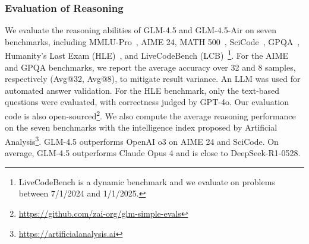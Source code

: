 \documentclass{article}
\theoremstyle{definition}
\begin{document}
\noindent\begin{minipage}{\textwidth}
\label{fig:tau-prompt}
\end{minipage}

\subsubsection{Evaluation of Reasoning}

We evaluate the reasoning abilities of GLM-4.5 and GLM-4.5-Air on seven benchmarks, including MMLU-Pro~\cite{wang2024mmlu}, AIME 24, MATH 500~\cite{hendrycks2measuring}, SciCode~\cite{tian2024scicode}, GPQA~\cite{rein2024gpqa}, Humanity's Last Exam (HLE)~\cite{phan2025humanity}, and LiveCodeBench (LCB)~\cite{jainlivecodebench}\footnote{LiveCodeBench is a dynamic benchmark and we evaluate on problems between 7/1/2024 and 1/1/2025.}. For the AIME and GPQA benchmarks, we report the average accuracy over 32 and 8 samples, respectively (Avg@32, Avg@8), to mitigate result variance. An LLM was used for automated answer validation. For the HLE benchmark, only the text-based questions were evaluated, with correctness judged by GPT-4o. Our evaluation code is also open-sourced\footnote{\url{https://github.com/zai-org/glm-simple-evals}}. We also compute the average reasoning performance on the seven benchmarks with the intelligence index proposed by Artificial Analysis\footnote{\url{https://artificialanalysis.ai}}. GLM-4.5 outperforms OpenAI o3 on AIME 24 and SciCode. On average, GLM-4.5 outperforms Claude Opus 4 and is close to DeepSeek-R1-0528.
\end{document}
